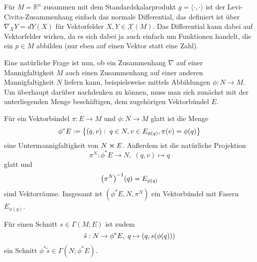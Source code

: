 \documentclass[../H_Analysis_main.tex]{subfiles}
\begin{document}


\begin{bsp}
Für $M = \mathbb{R}^n$ zusammen mit dem Standardskalarprodukt $g = \langle \cdot, \cdot \rangle$ ist der Levi-Civita-Zusammenhang einfach das normale Differential, das definiert ist über $\nabla_X Y = dY(X)$ für Vektorfelder $X, Y \in \mathcal{X}(M)$. Das Differential kann dabei auf Vektorfelder wirken, da es sich dabei ja auch einfach um Funktionen handelt, die ein $p \in M$ abbilden (nur eben auf einen Vektor statt eine Zahl).
\end{bsp}


\iffalse
\begin{bsp}[Zweite Fundamentalform]
machen?
\end{bsp}
\fi


Eine natürliche Frage ist nun, ob ein Zusammenhang $\nabla$ auf einer Mannigfaltigkeit $M$ auch einen Zusammenhang auf einer anderen Mannigfaltigkeit $N$ liefern kann, beispielsweise mittels Abbildungen $\phi: N \rightarrow M$. Um überhaupt darüber nachdenken zu können, muss man sich zunächst mit der unterliegenden Menge beschäftigen, dem zugehörigen Vektorbündel $E$.

\begin{satz}
Für ein Vektorbündel $\pi: E \rightarrow M$ und $\phi: N \rightarrow M$ glatt ist die Menge
\begin{equation}
\phi^* E := \qty{(q, v): \; q \in N, v \in E_{\phi(q)}, \pi(v) = \phi(q)}
\end{equation}
eine Untermannigfaltigkeit von $N \cross E$. Außerdem ist die natürliche Projektion
\begin{equation}
\pi^N: \phi^* E \rightarrow N, \; (q, v) \mapsto q
\end{equation}
glatt und
\begin{equation}
\qty(\pi^N)^{-1}(q) = E_{\phi(q)}
\end{equation}
sind Vektorräume. Insgesamt ist $(\phi^* E, N, \pi^N)$ ein Vektorbündel mit Fasern $E_{\phi(q)}$.

Für einen Schnitt $s \in \Gamma(M; E)$ ist zudem
\begin{equation}
\tilde{s}: N \rightarrow \phi^* E, \; q \mapsto \qty(q, s\qty(\phi(q)))
\end{equation}
ein Schnitt $\phi^* \tilde{s} \in \Gamma(N; \phi^* E)$.
\end{satz}
\end{document}
